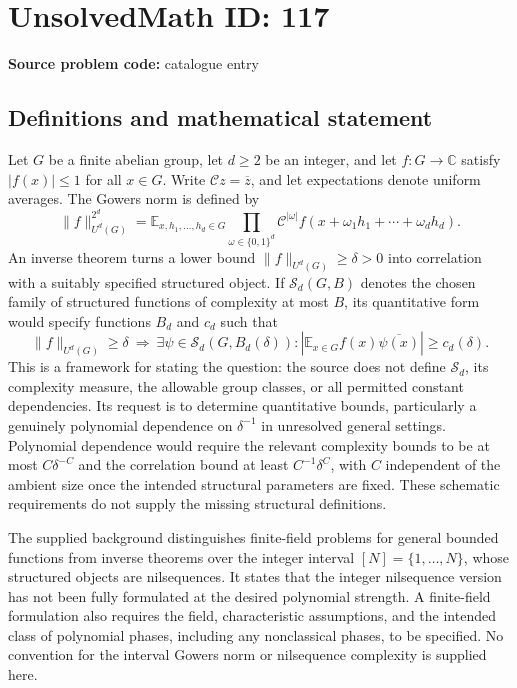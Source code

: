 \documentclass[11pt]{article}
\newcommand{\C}{\mathbb{C}}
\newcommand{\E}{\mathbb{E}}
\begin{document}
\section*{UnsolvedMath ID: 117}
\textbf{Source problem code:} catalogue entry
\subsection{Definitions and mathematical statement}
Let \(G\) be a finite abelian group, let \(d\geq 2\) be an integer, and let \(f:G\to\C\) satisfy \(|f(x)|\leq1\) for all \(x\in G\). Write \(\mathcal C z=\overline z\), and let expectations denote uniform averages. The Gowers norm is defined by
\[
\|f\|_{U^d(G)}^{2^d}=\E_{x,h_1,\ldots,h_d\in G}
\prod_{\omega\in\{0,1\}^d}\mathcal C^{|\omega|}
 f(x+\omega_1h_1+\cdots+\omega_dh_d).
\]
An inverse theorem turns a lower bound \(\|f\|_{U^d(G)}\geq\delta>0\) into correlation with a suitably specified structured object. If \(\mathcal S_d(G,B)\) denotes the chosen family of structured functions of complexity at most \(B\), its quantitative form would specify functions \(B_d\) and \(c_d\) such that
\[
\|f\|_{U^d(G)}\geq\delta
\ \Longrightarrow\
\exists\psi\in\mathcal S_d(G,B_d(\delta)):
\left|\E_{x\in G}f(x)\overline{\psi(x)}\right|\geq c_d(\delta).
\]
This is a framework for stating the question: the source does not define \(\mathcal S_d\), its complexity measure, the allowable group classes, or all permitted constant dependencies. Its request is to determine quantitative bounds, particularly a genuinely polynomial dependence on \(\delta^{-1}\) in unresolved general settings. Polynomial dependence would require the relevant complexity bounds to be at most \(C\delta^{-C}\) and the correlation bound at least \(C^{-1}\delta^C\), with \(C\) independent of the ambient size once the intended structural parameters are fixed. These schematic requirements do not supply the missing structural definitions.

The supplied background distinguishes finite-field problems for general bounded functions from inverse theorems over the integer interval \([N]=\{1,\ldots,N\}\), whose structured objects are nilsequences. It states that the integer nilsequence version has not been fully formulated at the desired polynomial strength. A finite-field formulation also requires the field, characteristic assumptions, and the intended class of polynomial phases, including any nonclassical phases, to be specified. No convention for the interval Gowers norm or nilsequence complexity is supplied here.
\end{document}
